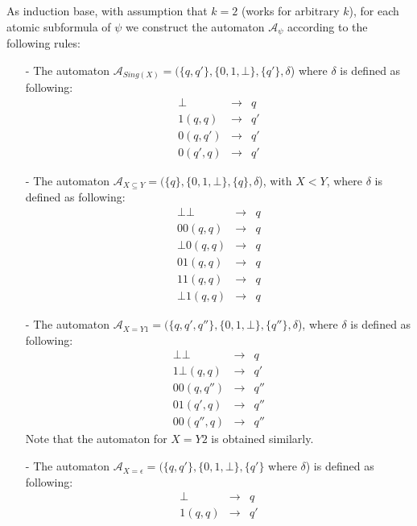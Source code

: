 As induction base, with assumption that $k = 2$ (works for arbitrary $k$), for each atomic subformula of $\psi$ we construct the automaton $\mathcal{A}_{\psi}$ according to the following rules:
\begin{itemize}
 \item[-] The automaton $\mathcal{A}_{Sing(X)} = (\{q, q'\}, \{0, 1, \bot\}, \{q'\}, \delta$) where $\delta$ is defined as following:
\begin{eqnarray*}
 \bot & \rightarrow & q\\
 1 (q, q) & \rightarrow & q'\\
 0 (q, q') & \rightarrow & q'\\
 0 (q', q) & \rightarrow & q'
\end{eqnarray*}
 \item[-] The automaton $\mathcal{A}_{X \subseteq Y} = (\{q\}, \{0, 1, \bot\}, \{q\}, \delta$), with $X < Y$, where $\delta$ is defined as following:
\begin{eqnarray*}
 \bot\bot & \rightarrow & q\\
 00 (q, q) & \rightarrow & q\\
 \bot 0 (q, q) & \rightarrow & q\\
 01 (q, q) & \rightarrow & q\\
 11 (q, q) & \rightarrow & q\\
 \bot1 (q, q) & \rightarrow & q
\end{eqnarray*}
 \item[-] The automaton $\mathcal{A}_{X = Y1} = (\{q, q', q''\}, \{0, 1, \bot\}, \{q''\}, \delta$), where $\delta$ is defined as following:
\begin{eqnarray*}
 \bot\bot & \rightarrow & q\\
 1\bot (q, q) & \rightarrow & q'\\
 00 (q, q'') & \rightarrow & q''\\
 01 (q', q) & \rightarrow & q''\\
 00 (q'', q) & \rightarrow & q''
\end{eqnarray*}
Note that the automaton for $X = Y2$ is obtained similarly.
 \item[-] The automaton $\mathcal{A}_{X = \epsilon} = (\{q, q'\}, \{0, 1, \bot\}, \{q'\}$ where $\delta$) is defined as following:
\begin{eqnarray*}
 \bot & \rightarrow & q\\
 1 (q, q) & \rightarrow & q'
\end{eqnarray*}
\end{itemize}

